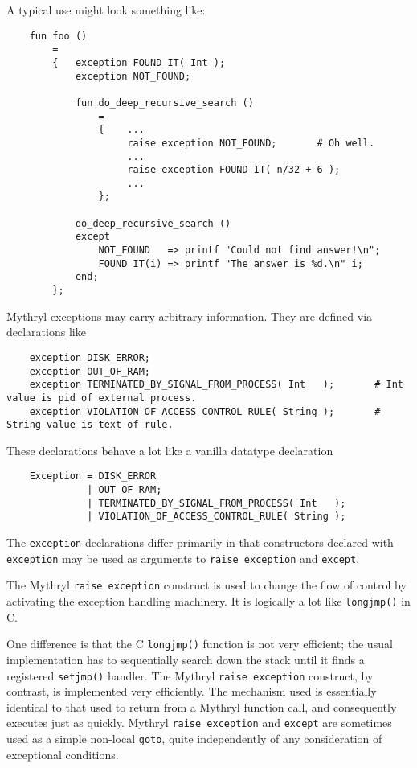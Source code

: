 A typical use might look something like:

\begin{verbatim}
    fun foo ()
        =
        {   exception FOUND_IT( Int );
            exception NOT_FOUND;

            fun do_deep_recursive_search ()
                =
                {    ...
                     raise exception NOT_FOUND;       # Oh well.
                     ...
                     raise exception FOUND_IT( n/32 + 6 );
                     ...
                };

            do_deep_recursive_search ()
            except
                NOT_FOUND   => printf "Could not find answer!\n";
                FOUND_IT(i) => printf "The answer is %d.\n" i;
            end;
        };
\end{verbatim}


Mythryl exceptions may carry arbitrary information.  They are 
defined via declarations like

\begin{verbatim}
    exception DISK_ERROR;
    exception OUT_OF_RAM;
    exception TERMINATED_BY_SIGNAL_FROM_PROCESS( Int   );       # Int value is pid of external process.
    exception VIOLATION_OF_ACCESS_CONTROL_RULE( String );       # String value is text of rule. 
\end{verbatim}

These declarations behave a lot like a vanilla 
datatype declaration

\begin{verbatim}
    Exception = DISK_ERROR
              | OUT_OF_RAM;
              | TERMINATED_BY_SIGNAL_FROM_PROCESS( Int   );
              | VIOLATION_OF_ACCESS_CONTROL_RULE( String );
\end{verbatim}

The {\tt exception} declarations differ primarily in that 
constructors declared with {\tt exception} may be used as arguments to {\tt raise exception} and {\tt except}.

The Mythryl {\tt raise exception} construct is used to change the flow of control 
by activating the exception handling machinery. 
It is logically a lot like {\tt longjmp()} in C.

One difference is that the C {\tt longjmp()} function is not very 
efficient; the usual implementation has to sequentially search down 
the stack until it finds a registered {\tt setjmp()} handler. 
The Mythryl {\tt raise exception} construct, by contrast, is implemented very 
efficiently.  The mechanism used is essentially identical to that 
used to return from a Mythryl function call, and consequently 
executes just as quickly.  Mythryl {\tt raise exception} and {\tt except} 
are sometimes used as a simple non-local {\tt goto}, quite independently 
of any consideration of exceptional conditions.

